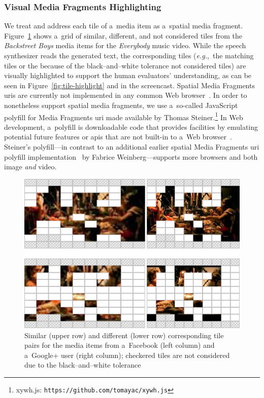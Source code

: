 \documentclass{article}
\begin{document}
\subsubsection{Visual Media Fragments Highlighting}
We treat and address each tile of a~media item as a~spatial media fragment. Figure~\ref{fig:similar-different} shows a~grid of similar, different, and not considered tiles from the \emph{Backstreet Boys} media items for the \emph{Everybody} music video. While the speech synthesizer reads the generated text, the corresponding tiles (\emph{e.g.},~the matching tiles or the because of the black--and--white tolerance not considered tiles) are visually highlighted to support the human evaluators' understanding, as can be seen in Figure~\ref{fig:tile-highlight} and in the screencast. Spatial Media Fragments {\sc uri}s are currently not implemented in any common Web browser~\cite{weinberg2013polyfill}. In order to nonetheless support spatial media fragments, we use a~so-called JavaScript polyfill for Media Fragments {\sc uri} made available by Thomas Steiner.\footnote{xywh.js: \texttt{https://github.com/tomayac/xywh.js}} In Web development, a~polyfill is downloadable code that provides facilities by emulating potential future features or {\sc api}s that are not built-in to a~Web browser~\cite{sharp2010polyfill}. Steiner's polyfill---in contrast to an additional earlier spatial Media Fragments {\sc uri} polyfill implementation~\cite{weinberg2013polyfill} by Fabrice Weinberg---supports more browsers and both image \emph{and} video.

\begin{figure}[t!]
  \centering
  \includegraphics[width=0.75\linewidth]{./similar-different.png}
  \caption{Similar (upper row) and different (lower row) corresponding tile pairs for the media items from a~Facebook (left column) and a~Google+ user (right column); checkered tiles are not considered due to the black--and--white tolerance}
  \label{fig:similar-different}
\end{figure}
\end{document}
